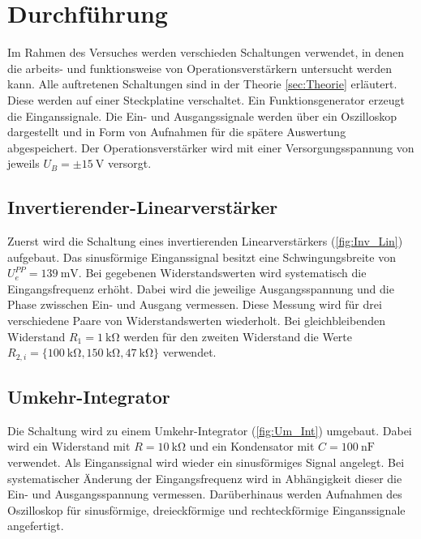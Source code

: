 \section{Durchführung}
\label{sec:Durchführung}

Im Rahmen des Versuches werden verschieden Schaltungen verwendet, in denen die arbeits- und funktionsweise von Operationsverstärkern untersucht werden kann.
Alle auftretenen Schaltungen sind in der Theorie \ref{sec:Theorie} erläutert.
Diese werden auf einer Steckplatine verschaltet.
Ein Funktionsgenerator erzeugt die Einganssignale.
Die Ein- und Ausgangssignale werden über ein Oszilloskop dargestellt und in Form von Aufnahmen für die spätere Auswertung abgespeichert. 
Der Operationsverstärker wird mit einer Versorgungsspannung von jeweils $U_B=\pm\SI{15}{\volt}$ versorgt.




\subsection{Invertierender-Linearverstärker}
Zuerst wird die Schaltung eines invertierenden Linearverstärkers (\ref{fig:Inv_Lin}) aufgebaut. 
Das sinusförmige Einganssignal besitzt eine Schwingungsbreite von $U_e^{PP}=\SI{139}{\milli\volt}$.
Bei gegebenen Widerstandswerten wird systematisch die Eingangsfrequenz erhöht.
Dabei wird die jeweilige Ausgangsspannung und die Phase zwisschen Ein- und Ausgang vermessen.
Diese Messung wird für drei verschiedene Paare von Widerstandswerten wiederholt.
Bei gleichbleibenden Widerstand $R_1=\SI{1}{\kilo\ohm}$ werden für den zweiten Widerstand die Werte $R_{2,i}=\{\SI{100}{\kilo\ohm},\SI{150}{\kilo\ohm},\SI{47}{\kilo\ohm}\}$ verwendet.

\subsection{Umkehr-Integrator}
\label{sub:Um_Int}

Die Schaltung wird zu einem Umkehr-Integrator (\ref{fig:Um_Int}) umgebaut. 
Dabei wird ein Widerstand mit $R = \SI{10}{\kilo\ohm}$ und ein Kondensator mit $C=\SI{100}{\nano\farad}$ verwendet.
Als Einganssignal wird wieder ein sinusförmiges Signal angelegt.
Bei systematischer Änderung der Eingangsfrequenz wird in Abhängigkeit dieser die Ein- und Ausgangsspannung vermessen.
Darüberhinaus werden Aufnahmen des Oszilloskop für sinusförmige, dreieckförmige und rechteckförmige Einganssignale angefertigt.



